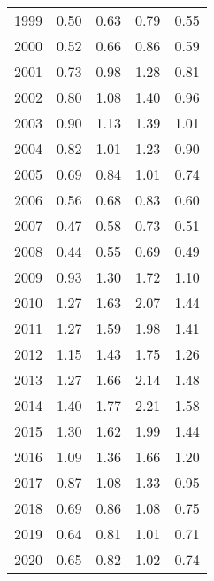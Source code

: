 \documentclass[11pt]{book}
\begin{document}
\begin{longtable}[]{@{}lrrrr@{}}
1999 & 0.50 & 0.63 & 0.79 & 0.55\tabularnewline
2000 & 0.52 & 0.66 & 0.86 & 0.59\tabularnewline
2001 & 0.73 & 0.98 & 1.28 & 0.81\tabularnewline
2002 & 0.80 & 1.08 & 1.40 & 0.96\tabularnewline
2003 & 0.90 & 1.13 & 1.39 & 1.01\tabularnewline
2004 & 0.82 & 1.01 & 1.23 & 0.90\tabularnewline
2005 & 0.69 & 0.84 & 1.01 & 0.74\tabularnewline
2006 & 0.56 & 0.68 & 0.83 & 0.60\tabularnewline
2007 & 0.47 & 0.58 & 0.73 & 0.51\tabularnewline
2008 & 0.44 & 0.55 & 0.69 & 0.49\tabularnewline
2009 & 0.93 & 1.30 & 1.72 & 1.10\tabularnewline
2010 & 1.27 & 1.63 & 2.07 & 1.44\tabularnewline
2011 & 1.27 & 1.59 & 1.98 & 1.41\tabularnewline
2012 & 1.15 & 1.43 & 1.75 & 1.26\tabularnewline
2013 & 1.27 & 1.66 & 2.14 & 1.48\tabularnewline
2014 & 1.40 & 1.77 & 2.21 & 1.58\tabularnewline
2015 & 1.30 & 1.62 & 1.99 & 1.44\tabularnewline
2016 & 1.09 & 1.36 & 1.66 & 1.20\tabularnewline
2017 & 0.87 & 1.08 & 1.33 & 0.95\tabularnewline
2018 & 0.69 & 0.86 & 1.08 & 0.75\tabularnewline
2019 & 0.64 & 0.81 & 1.01 & 0.71\tabularnewline
2020 & 0.65 & 0.82 & 1.02 & 0.74\tabularnewline
\bottomrule
\end{longtable}
\clearpage
\end{document}
